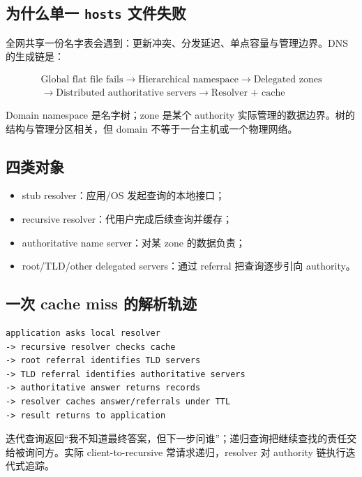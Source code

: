 \documentclass[UTF8,fontset=none,11pt,a4paper]{ctexart}
\providecommand{\tightlist}{\setlength{\itemsep}{0pt}\setlength{\parskip}{0pt}}
\begin{document}
\subsection{\texorpdfstring{为什么单一 \texttt{hosts}
文件失败}{为什么单一 hosts 文件失败}}\label{31-ux4e3aux4ec0ux4e48ux5355ux4e00-hosts-ux6587ux4ef6ux5931ux8d25}

全网共享一份名字表会遇到：更新冲突、分发延迟、单点容量与管理边界。DNS
的生成链是：

\[
\boxed{\begin{gathered}
\text{Global flat file fails}\to\text{Hierarchical namespace}\to\text{Delegated zones}\\
\to\text{Distributed authoritative servers}\to\text{Resolver + cache}
\end{gathered}}
\]

Domain namespace 是名字树；zone 是某个 authority
实际管理的数据边界。树的结构与管理分区相关，但 domain
不等于一台主机或一个物理网络。

\subsection{四类对象}\label{32-ux56dbux7c7bux5bf9ux8c61}

\begin{itemize}
\tightlist
\item
  stub resolver：应用/OS 发起查询的本地接口；
\item
  recursive resolver：代用户完成后续查询并缓存；
\item
  authoritative name server：对某 zone 的数据负责；
\item
  root/TLD/other delegated servers：通过 referral 把查询逐步引向
  authority。
\end{itemize}

\subsection{一次 cache miss
的解析轨迹}\label{33-ux4e00ux6b21-cache-miss-ux7684ux89e3ux6790ux8f68ux8ff9}

\begin{lstlisting}
application asks local resolver
-> recursive resolver checks cache
-> root referral identifies TLD servers
-> TLD referral identifies authoritative servers
-> authoritative answer returns records
-> resolver caches answer/referrals under TTL
-> result returns to application
\end{lstlisting}

迭代查询返回``我不知道最终答案，但下一步问谁''；递归查询把继续查找的责任交给被询问方。实际
client-to-recursive 常请求递归，resolver 对 authority 链执行迭代式追踪。
\end{document}
